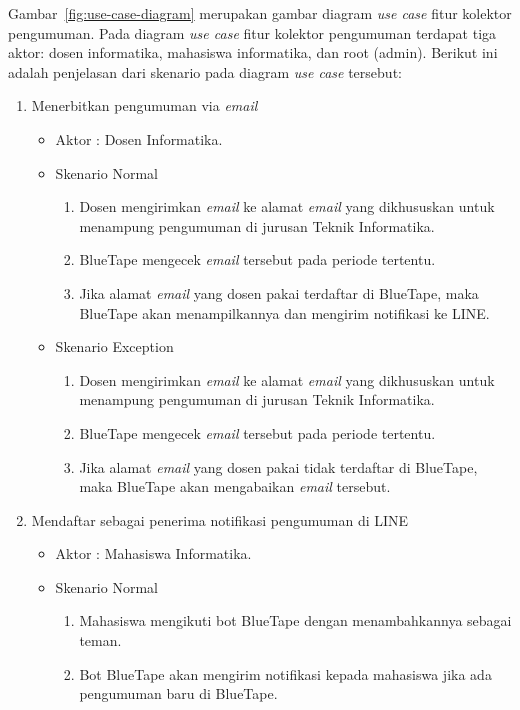 Gambar~\ref{fig:use-case-diagram} merupakan gambar diagram \textit{use case} fitur kolektor pengumuman. Pada diagram \textit{use case} fitur kolektor pengumuman terdapat tiga aktor: dosen informatika, mahasiswa informatika, dan root (admin). Berikut ini adalah penjelasan dari skenario pada diagram \textit{use case} tersebut:
\begin{enumerate}
\item Menerbitkan pengumuman via \textit{email}

\begin{itemize}
	\item Aktor : Dosen Informatika.
	\item Skenario Normal

	\begin{enumerate}
		\item Dosen mengirimkan \textit{email} ke alamat \textit{email} yang dikhususkan untuk menampung pengumuman di jurusan Teknik Informatika.
		\item BlueTape mengecek \textit{email} tersebut pada periode tertentu.
		\item Jika alamat \textit{email} yang dosen pakai terdaftar di BlueTape, maka BlueTape akan menampilkannya dan mengirim notifikasi ke LINE.
	\end{enumerate}
	
	\item Skenario Exception
	\begin{enumerate}
		\item Dosen mengirimkan \textit{email} ke alamat \textit{email} yang dikhususkan untuk menampung pengumuman di jurusan Teknik Informatika.
		\item BlueTape mengecek \textit{email} tersebut pada periode tertentu.
		\item Jika alamat \textit{email} yang dosen pakai tidak terdaftar di BlueTape, maka BlueTape akan mengabaikan \textit{email} tersebut.
	\end{enumerate}
\end{itemize}

\item Mendaftar sebagai penerima notifikasi pengumuman di LINE

\begin{itemize}
	\item Aktor : Mahasiswa Informatika.
	\item Skenario Normal

	\begin{enumerate}
		\item Mahasiswa mengikuti bot BlueTape dengan menambahkannya sebagai teman.
		\item Bot BlueTape akan mengirim notifikasi kepada mahasiswa jika ada pengumuman baru di BlueTape.
	\end{enumerate}
\end{itemize}


\end{enumerate}
